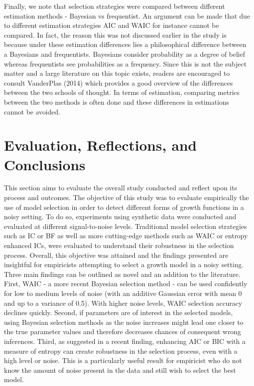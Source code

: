 \documentclass[12pt,]{article}
\begin{document}
Finally, we note that selection strategies were compared between different estimation methods - Bayesian vs frequentist. An argument can be made that due to different estimation strategies AIC and WAIC for instance cannot be compared. In fact, the reason this was not discussed earlier in the study is because under these estimation differences lies a philosophical difference between a Bayesians and frequentists. Bayesians consider probability as a degree of belief whereas frequentists see probabilities as a frequency. Since this is not the subject matter and a large literature on this topic exists, readers are encouraged to consult VanderPlas (2014) which provides a good overview of the differences between the two schools of thought. In terms of estimation, comparing metrics between the two methods is often done and these differences in estimations cannot be avoided.

\hypertarget{conclusion}{%
\section{Evaluation, Reflections, and Conclusions}\label{conclusion}}

This section aims to evaluate the overall study conducted and reflect upon its process and outcomes.
The objective of this study was to evaluate empirically the use of model selection in order to detect different forms of growth functions in a noisy setting. To do so, experiments using synthetic data were conducted and evaluated at different signal-to-noise levels. Traditional model selection strategies such as IC or BF as well as more cutting-edge methods such as WAIC or entropy enhanced ICs, were evaluated to understand their robustness in the selection process. Overall, this objective was attained and the findings presented are insightful for empiricists attempting to select a growth model in a noisy setting. Three main findings can be outlined as novel and an addition to the literature.
First, WAIC - a more recent Bayesian selection method - can be used confidently for low to medium levels of noise (with an additive Gaussian error with mean 0 and up to a variance of 0.5). With higher noise levels, WAIC selection accuracy declines quickly.
Second, if parameters are of interest in the selected models, using Bayesian selection methods as the noise increases might lead one closer to the true parameter values and therefore decreases chances of consequent wrong inferences.
Third, as suggested in a recent finding, enhancing AIC or BIC with a measure of entropy can create robustness in the selection process, even with a high level or noise. This is a particularly useful result for empiricist who do not know the amount of noise present in the data and still wish to select the best model.
\end{document}
